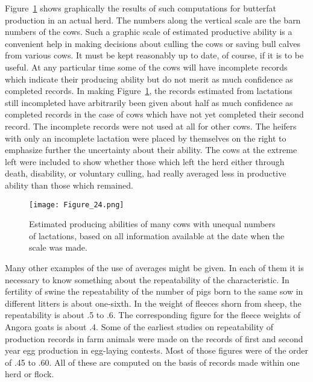 Figure~\ref{fig:Lush_Figure_24} shows graphically the results of such computations for
butterfat production in an actual herd. The numbers along the vertical
scale are the barn numbers of the cows. Such a graphic scale of estimated
productive ability is a convenient help in making decisions about
culling the cows or saving bull calves from various cows. It must be
kept reasonably up to date, of course, if it is to be useful. At any particular
time some of the cows will have incomplete records which indicate
their producing ability but do not merit as much confidence as completed
records. In making Figure~\ref{fig:Lush_Figure_24}, the records estimated from lactations
still incompleted have arbitrarily been given about half as much
confidence as completed records in the case of cows which have not yet
completed their second record. The incomplete records were not used
at all for other cows. The heifers with only an incomplete lactation were
placed by themselves on the right to emphasize further the uncertainty
about their ability. The cows at the extreme left were included to show
whether those which left the herd either through death, disability, or
voluntary culling, had really averaged less in productive ability than
those which remained.

\begin{figure}[htbp]
	\centering
    \texttt{[image: Figure\_24.png]}
    \caption{Estimated producing abilities of many cows with unequal numbers of
    		 lactations, based on all information available at the date when the
    		 scale was made.}
    \label{fig:Lush_Figure_24}
\end{figure}

Many other examples of the use of averages might be given. In each
of them it is necessary to know something about the repeatability of the
characteristic. In fertility of swine the repeatability of the number of
pigs born to the same sow in different litters is about one-sixth. In the
weight of fleeces shorn from sheep, the repeatability is about .5 to .6.
The corresponding figure for the fleece weights of Angora goats is about
.4. Some of the earliest studies on repeatability of production records in
farm animals were made on the records of first and second year egg production
in egg-laying contests. Most of those figures were of the order of
.45 to .60. All of these are computed on the basis of records made within
one herd or flock.

